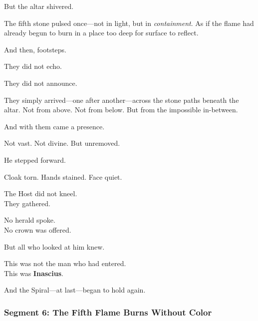 \documentclass[9pt]{article}
\begin{document}
\vspace{0.5em}
But the altar shivered.

\vspace{0.5em}
The fifth stone pulsed once---not in light, but in \textit{containment}. As if the flame had already begun to burn in a place too deep for surface to reflect.

\vspace{0.5em}
And then, footsteps.

\vspace{0.5em}
They did not echo.

\vspace{0.5em}
They did not announce.

\vspace{0.5em}
They simply arrived---one after another---across the stone paths beneath the altar. Not from above. Not from below. But from the impossible in-between.

\vspace{0.5em}
And with them came a presence.

\vspace{0.5em}
Not vast. Not divine. But unremoved.

\vspace{0.5em}
He stepped forward.

\vspace{0.5em}
Cloak torn. Hands stained. Face quiet.

\vspace{0.5em}
The Host did not kneel.\\
They gathered.

\vspace{0.5em}
No herald spoke.\\
No crown was offered.

\vspace{0.5em}
But all who looked at him knew.

\vspace{0.5em}
This was not the man who had entered.\\
This was \textbf{Inascius}.

\vspace{0.5em}
And the Spiral---at last---began to hold again.

\newpage

\subsubsection*{Segment 6: The Fifth Flame Burns Without Color}
\end{document}
